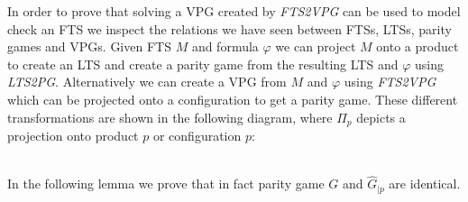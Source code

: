 In order to prove that solving a VPG created by \textit{FTS2VPG} can be used to model check an FTS we inspect the relations we have seen between FTSs, LTSs, parity games and VPGs. Given FTS $M$ and formula $\varphi$ we can project $M$ onto a product to create an LTS and create a parity game from the resulting LTS and $\varphi$ using \textit{LTS2PG}. Alternatively we can create a VPG from $M$ and $\varphi$ using \textit{FTS2VPG} which can be projected onto a configuration to get a parity game. These different transformations are shown in the following diagram, where $\Pi_p$ depicts a projection onto product $p$ or configuration $p$:\\
\\
In the following lemma we prove that in fact parity game $G$ and $\hat{G}_{|p}$ are identical.
